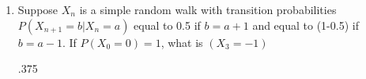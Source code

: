 \documentclass[10pt]{article}
\begin{document}
\begin{enumerate}
\newpage

  \item Suppose $X_n$ is a simple random walk with transition
    probabilities $P(X_{n+1} = b|X_n = a)$ equal to 0.5 if $b=a+1$ and
    equal to (1-0.5) if $b=a-1$.  If $P(X_0=0)=1$, what is $(X_3=-1)$

    .375

\end{enumerate}
\end{document}
